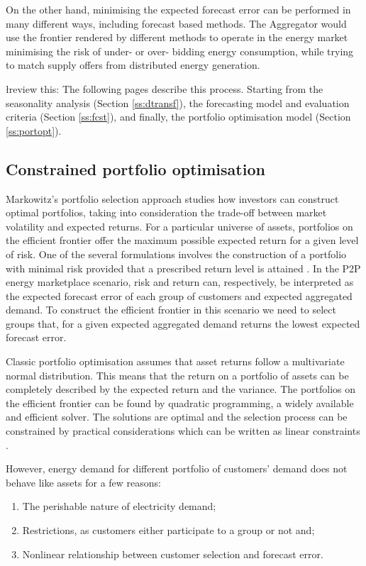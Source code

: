 \documentclass[preprint,3p,12pt,authoryear]{elsarticle}
\begin{document}
On the other hand, minimising the expected forecast error can be performed in many different ways, including forecast based methods.
The Aggregator would use the frontier rendered by different methods to operate in the energy market minimising the risk of under- or over- bidding energy consumption, while trying to match supply offers from distributed energy generation.

\l{review this:} The following pages describe this process. Starting from the seasonality analysis (Section \ref{ss:dtransf}), the forecasting model and evaluation criteria (Section \ref{ss:fcst}), and finally, the portfolio optimisation model (Section \ref{ss:portopt}).

\subsection{Constrained portfolio optimisation}
\label{ss:sdevgrp}
Markowitz’s portfolio selection approach studies how investors can construct optimal portfolios, taking into consideration the trade-off between market volatility and expected returns.
For a particular universe of assets, portfolios on the efficient frontier offer the maximum possible expected return for a given level of risk.
One of the several formulations involves the construction of a portfolio with minimal risk provided that a prescribed return level is attained \citep{bonami2009portopt}.
In the P2P energy marketplace scenario, risk and return can, respectively, be interpreted as the expected forecast error of each group of customers and expected aggregated demand.
To construct the efficient frontier in this scenario we need to select groups that, for a given expected aggregated demand returns the lowest expected forecast error.

Classic portfolio optimisation assumes that asset returns follow a multivariate normal distribution.
This means that the return on a portfolio of assets can be completely described by the expected return and the variance.
The portfolios on the efficient frontier can be found by quadratic programming, a widely available and efficient solver.
The solutions are optimal and the selection process can be constrained by practical considerations which can be written as linear constraints \citep{CHANG20001271}.

However, energy demand for different portfolio of customers' demand does not behave like assets for a few reasons:
\begin{enumerate}
   \item The perishable nature of electricity demand;
   \item Restrictions, as customers either participate to a group or not and;
   \item Nonlinear relationship between customer selection and forecast error.
\end{enumerate}
\end{document}
